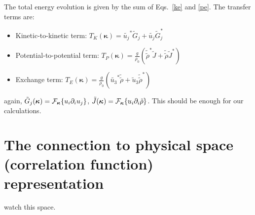 \documentclass[12pt]{article}
\newcommand{\bk}{\bm{\kappa}}
\begin{document}
The total energy evolution is given by the sum of Eqs.~\ref{ke} and \ref{pe}. The transfer terms are:
\begin{itemize}
\item Kinetic-to-kinetic term: $T_K(\bk)=\tilde{u_j}^* \tilde G_j + \tilde{u_j} \tilde G_j^*$

\item Potential-to-potential term: $T_P(\bk)=\frac{g }{\rho_0} (\tilde{\tilde \rho}^* \tilde J +  \tilde{\tilde \rho} \tilde J^*)$

\item Exchange term: $T_E(\bk)=\frac{g}{\rho_0}(\tilde{u_3}^*\tilde{\tilde \rho}  + \tilde u_3 \tilde{\tilde \rho}^*)$
\end{itemize}again, $\tilde G_j(\bk) = {\cal F}_{\bk}\{u_i \partial_i u_j\}$, $\tilde J(\bk) = {\cal F}_{\bm{\kappa}}\{u_i \partial_i \tilde\rho\}$.
This should be enough for our calculations.

\section{The connection to physical space (correlation function) representation}

watch this space.
\end{document}
